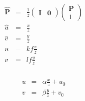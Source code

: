 \documentclass{beamer}
\newcommand{\nospace}{}
\newcommand{\tmmathbf}[1]{\ensuremath{\boldsymbol{#1}}}
\begin{document}
{{\begin{frame}
\end{frame}}{\begin{frame}
  \frametitle{}
  \begin{eqnarray*}
    \hat{\tmmathbf{P}} & = & \frac{1}{z} \left(\begin{array}{cc}
      \tmmathbf{I} & \tmmathbf{0}
    \end{array}\right) \left(\begin{array}{c}
      \tmmathbf{P}\\
      1
    \end{array}\right)\\
    \hat{u} & = & \frac{x}{z}\\
    \hat{v} & = & \frac{y}{z}\\
    u & = & k \nospace f \frac{x}{z}\\
    v & = & l \nospace f \frac{y}{z}
  \end{eqnarray*}
\end{frame}}{\begin{frame}
  \frametitle{}
  \begin{eqnarray*}
    u & = & \alpha \frac{x}{z} + u_0\\
    v & = & \beta \frac{y}{z} + v_0
  \end{eqnarray*}
  

\end{frame}}}
\end{document}
